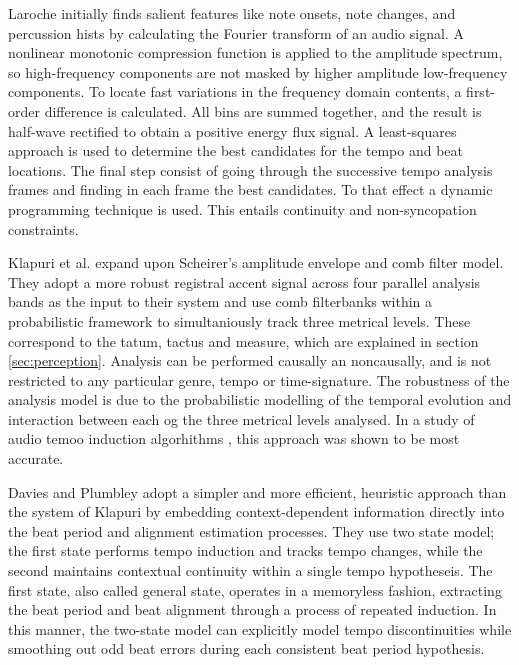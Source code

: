 \documentclass{scrartcl}
\begin{document}

Laroche \cite{Laroche2003} initially finds salient features like note onsets, note changes, and percussion hists by calculating the Fourier transform of an audio signal. A nonlinear monotonic compression function is applied to the amplitude spectrum, so high-frequency components are not masked by higher amplitude low-frequency components. To locate fast variations in the frequency domain contents, a first-order difference is calculated. All bins are summed together, and the result is half-wave rectified to obtain a positive energy flux signal. A least-squares approach is used to determine the best candidates for the tempo and beat locations. The final step consist of going through the successive tempo analysis frames and finding in each frame the best candidates. To that effect a dynamic programming technique is used. This entails continuity and non-syncopation constraints. 

Klapuri et al. \cite{Klapuri2005} expand upon Scheirer's amplitude envelope and comb filter model. They adopt a more robust registral accent signal across four parallel analysis bands as the input to their system and use comb filterbanks within a probabilistic framework to simultaniously track three metrical levels. These correspond to the tatum, tactus and measure, which are explained in section \ref{sec:perception}. Analysis can be performed causally an noncausally, and is not restricted to any particular genre, tempo or time-signature. The robustness of the analysis model is due to the probabilistic modelling of the temporal evolution and interaction between each og the three metrical levels analysed. In a study of audio temoo induction algorhithms \cite{Gouyon2006b}, this approach was shown to be most accurate.

Davies and Plumbley \cite{Davies2007} adopt a simpler and more efficient, heuristic approach than the system of Klapuri by embedding context-dependent information directly into the beat period and alignment estimation processes. They use two state model; the first state performs tempo induction and tracks tempo changes, while the second maintains contextual continuity within a single tempo hypotheseis. The first state, also called general state, operates in a memoryless fashion, extracting the beat period and beat alignment through a process of repeated induction. In this manner, the two-state model can explicitly model tempo discontinuities while smoothing out odd beat errors during each consistent beat period hypothesis. 
\end{document}
